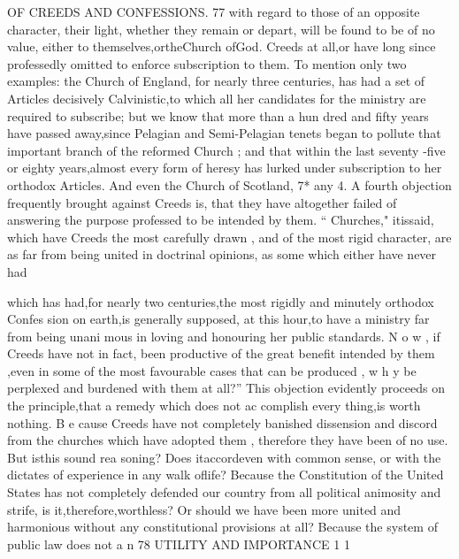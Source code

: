 \documentclass[
]{book}
\begin{document}
OF CREEDS AND CONFESSIONS. 77
with regard to those of an opposite character,
their light, whether they remain or depart, will be found to be of no value, either to themselves,ortheChurch ofGod.
Creeds
at all,or have long since professedly omitted to enforce subscription to them. To mention
only two examples: the Church of England, for nearly three centuries, has had a set of Articles decisively Calvinistic,to which all her candidates for the ministry are required to subscribe; but we know that more than a hun dred and fifty years have passed away,since Pelagian and Semi-Pelagian tenets began to pollute that important branch of the reformed Church ; and that within the last seventy -five or eighty years,almost every form of heresy has lurked under subscription to her orthodox Articles. And even the Church of Scotland,
7*
any
4. A fourth objection frequently brought
against Creeds is, that they have altogether
failed of answering the purpose professed to
be intended by them. `` Churches," itissaid, which have Creeds the most carefully drawn ,
and of the most rigid character, are as far
from being united in doctrinal opinions, as some which either have never had

which has had,for nearly two centuries,the
most rigidly and minutely orthodox Confes
sion on earth,is generally supposed, at this
hour,to have a ministry far from being unani
mous in loving and honouring her public
standards. N o w , if Creeds have not in fact,
been productive of the great benefit intended
by them ,even in some of the most favourable
cases that can be produced , w h y be perplexed and burdened with them at all?''
This objection evidently proceeds on the principle,that a remedy which does not ac complish every thing,is worth nothing. B e
cause Creeds have not completely banished dissension and discord from the churches
which have adopted them , therefore they have been of no use. But isthis sound rea soning? Does itaccordeven with common
sense, or with the dictates of experience in any walk oflife? Because the Constitution of the United States has not completely defended our country from all political animosity and strife, is it,therefore,worthless? Or should we have been more united and harmonious without any constitutional provisions at all? Because the system of public law does not a n
78
UTILITY AND IMPORTANCE
1
1
\end{document}
